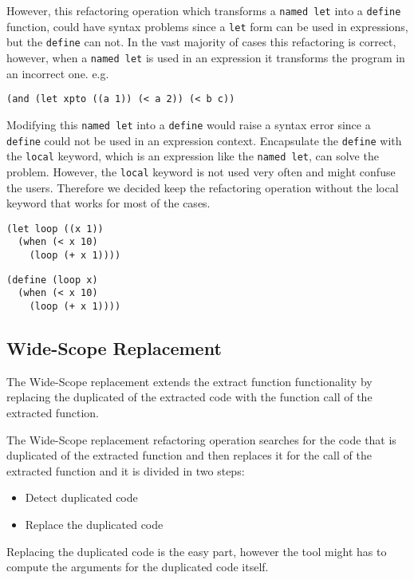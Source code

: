 However, this refactoring operation which transforms a {\tt named let} into a {\tt define} function,
 could have syntax problems since a {\tt let} form can be used in expressions, but the {\tt define} can not.
In the vast majority of cases this refactoring is correct, however, when a {\tt named let} is used in an expression
it transforms the program in an incorrect one.
e.g.
\begin{lstlisting}[basicstyle=\ttfamily, caption=Let in an expression]
(and (let xpto ((a 1)) (< a 2)) (< b c))
\end{lstlisting}
Modifying this {\tt named let} into a {\tt define} would raise a syntax error since a
{\tt define} could not be used in an expression context.
Encapsulate the {\tt define} with the {\tt local} keyword, which is an expression like
the {\tt named let}, can solve the problem.
However, the {\tt local} keyword is not used very often and might confuse the users.
Therefore we decided keep the refactoring operation without the local keyword that works for
most of the cases.

\begin{lstlisting}[basicstyle=\ttfamily, caption=Let example]
(let loop ((x 1))
  (when (< x 10)
    (loop (+ x 1))))
\end{lstlisting}
\begin{lstlisting}[basicstyle=\ttfamily, caption=Let to Define Function example]
(define (loop x)
  (when (< x 10)
    (loop (+ x 1))))
\end{lstlisting}

\subsection{Wide-Scope Replacement}
The Wide-Scope replacement extends the extract function functionality by replacing
the duplicated of the extracted code with the function call of the extracted function.


The Wide-Scope replacement refactoring operation searches for the code that is duplicated of the extracted
function and then replaces it for the call of the
extracted function and it is divided in two steps:
\begin{itemize}
\item Detect duplicated code
\item Replace the duplicated code
\end{itemize}

Replacing the duplicated code is the easy part, however the tool might has to compute
the arguments for the duplicated code itself.

